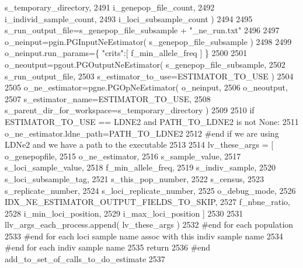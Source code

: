 \begin{DoxyCode}
      s\_temporary\_directory, 
2491                                                                                                 
      i\_genepop\_file\_count, 
2492                                                                                                     
      i\_individ\_sample\_count,
2493                                                                                                         
      i\_loci\_subsample\_count )
2494 
2495                 s\_run\_output\_file=s\_genepop\_file\_subsample + \textcolor{stringliteral}{"\_ne\_run.txt"}
2496 
2497                 o\_neinput=pgin.PGInputNeEstimator( s\_genepop\_file\_subsample )
2498 
2499                 o\_neinput.run\_params=\{ \textcolor{stringliteral}{"crits"}:[ f\_min\_allele\_freq ]  \}
2500 
2501                 o\_neoutput=pgout.PGOutputNeEstimator( s\_genepop\_file\_subsample, 
2502                                                         s\_run\_output\_file, 
2503                                                         s\_estimator\_to\_use=ESTIMATOR\_TO\_USE )   
2504                 
2505                 o\_ne\_estimator=pgne.PGOpNeEstimator( o\_neinput, 
2506                                                         o\_neoutput, 
2507                                                         s\_estimator\_name=ESTIMATOR\_TO\_USE,
2508                                                         s\_parent\_dir\_for\_workspace=s\_temporary\_directory ) 
2509                 
2510                 \textcolor{keywordflow}{if} ESTIMATOR\_TO\_USE == LDNE2 \textcolor{keywordflow}{and} PATH\_TO\_LDNE2 \textcolor{keywordflow}{is} \textcolor{keywordflow}{not} \textcolor{keywordtype}{None}:
2511                     o\_ne\_estimator.ldne\_path=PATH\_TO\_LDNE2
2512                 \textcolor{comment}{#end if we are using LDNe2 and we have a path to the executable}
2513 
2514                 lv\_these\_args = [ o\_genepopfile,  
2515                                     o\_ne\_estimator, 
2516                                     s\_sample\_value, 
2517                                     s\_loci\_sample\_value,
2518                                     f\_min\_allele\_freq, 
2519                                     s\_indiv\_sample, 
2520                                     s\_loci\_subsample\_tag,
2521                                     s\_this\_pop\_number, 
2522                                     s\_census,
2523                                     s\_replicate\_number, 
2524                                     s\_loci\_replicate\_number,
2525                                     o\_debug\_mode,
2526                                     IDX\_NE\_ESTIMATOR\_OUTPUT\_FIELDS\_TO\_SKIP,
2527                                     f\_nbne\_ratio,
2528                                     i\_min\_loci\_position,
2529                                     i\_max\_loci\_position ]
2530 
2531                 llv\_args\_each\_process.append( lv\_these\_args )
2532             \textcolor{comment}{#end for each population}
2533         \textcolor{comment}{#end for each loci sample name assoc with this indiv sample name}
2534     \textcolor{comment}{#end for each indiv sample name}
2535     \textcolor{keywordflow}{return}
2536 \textcolor{comment}{#end add\_to\_set\_of\_calls\_to\_do\_estimate}
2537 
\end{DoxyCode}
